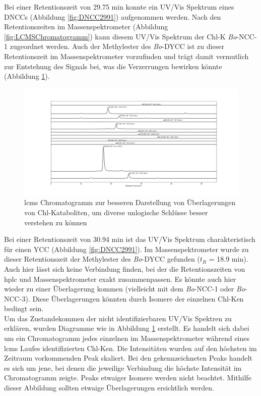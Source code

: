 Bei einer Retentionszeit von 29.75 min konnte ein UV/Vis Spektrum eines \gls{DNCC}s (Abbildung \ref{fig:DNCC2991}) aufgenommen werden. Nach den Retentionszeiten im Massenspektrometer (Abbildung \ref{fig:LCMSChromatogramm}) kann diesem UV/Vis Spektrum der \gls{Chl-K} \textit{Bo}-NCC-1 zugeordnet werden. Auch der Methylester des \textit{Bo}-DYCC ist zu dieser Retentionszeit im Massenspektrometer vorzufinden und trägt damit vermutlich zur Entstehung des Signals bei, was die Verzerrungen bewirken könnte (Abbildung \ref{fig:LCMSChromatogrammAufspaltung}).

\begin{figure}[!htbp]
  \includegraphics[width=1.4\textwidth, center]{figures/Kapitel6/keineReaktion/Kuerbis_Analyse_keineReaktion2_LC-ESI-MS.png}
  \caption[LC-MS Chromatogramm vor der Reaktion - Aufspaltung der Signale, Quelle: Autor]{\gls{lcms} Chromatogramm zur besseren Darstellung von Überlagerungen von Chl-Kataboliten, um diverse unlogische Schlüsse besser verstehen zu können}
  \label{fig:LCMSChromatogrammAufspaltung}
\end{figure}

Bei einer Retentionszeit von 30.94 min ist das UV/Vis Spektrum charakteristisch für einen \gls{YCC} (Abbildung \ref{fig:DNCC2991}). Im Massenspektrometer wurde zu dieser Retentionszeit der Methylester des \textit{Bo}-DYCC gefunden ($t_R$ = 18.9 min). Auch hier lässt sich keine Verbindung finden, bei der die Retentionszeiten von \gls{hplc} und Massenspektrometer exakt zusammenpassen. Es könnte auch hier wieder zu einer Überlagerung kommen (vielleicht mit dem \textit{Bo}-NCC-1 oder \textit{Bo}-NCC-3). Diese Überlagerungen könnten durch Isomere der einzelnen \gls{Chl-K}en bedingt sein. \\
 

Um das Zustandekommen der nicht identifizierbaren UV/Vis Spektren zu erklären, wurden Diagramme wie in Abbildung \ref{fig:LCMSChromatogrammAufspaltung} erstellt. Es handelt sich dabei um ein Chromatogramm jedes einzelnen im Massenspektrometer während eines \gls{lcms} Laufes identifizierten \gls{Chl-K}en. Die Intensitäten wurden auf den höchsten im Zeitraum vorkommenden Peak skaliert. Bei den gekennzeichneten Peaks handelt es sich um jene, bei denen die jeweilige Verbindung die höchste Intensität im Chromatogramm zeigte. Peaks etwaiger Isomere werden nicht beachtet. Mithilfe dieser Abbildung sollten etwaige Überlagerungen ersichtlich werden. 

